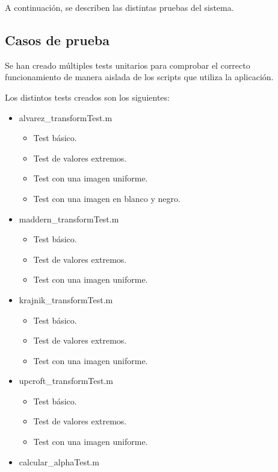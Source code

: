 A continuación, se describen las distintas pruebas del sistema.

\subsection{Casos de prueba}\label{casos-de-prueba}

Se han creado múltiples tests unitarios para comprobar el correcto funcionamiento de manera aislada de los scripts que utiliza la aplicación.

Los distintos tests creados son los siguientes:

\begin{itemize}
    \item alvarez\_transformTest.m
    \begin{itemize}
        \item Test básico.
        \item Test de valores extremos.
        \item Test con una imagen uniforme.
        \item Test con una imagen en blanco y negro.
    \end{itemize}
    \item maddern\_transformTest.m
    \begin{itemize}
        \item Test básico.
        \item Test de valores extremos.
        \item Test con una imagen uniforme.
    \end{itemize}
    \item krajnik\_transformTest.m
    \begin{itemize}
        \item Test básico.
        \item Test de valores extremos.
        \item Test con una imagen uniforme.
    \end{itemize}
    \item upcroft\_transformTest.m
    \begin{itemize}
        \item Test básico.
        \item Test de valores extremos.
        \item Test con una imagen uniforme.
    \end{itemize}
    \item calcular\_alphaTest.m
    \begin{itemize}

\end{itemize}
\end{itemize}
